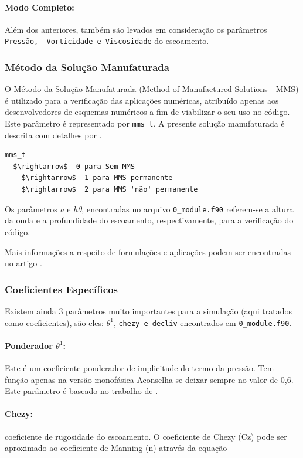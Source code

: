 \documentclass[12pt, a4paper]{article}
\begin{document}
\paragraph{Modo Completo:} Além dos anteriores, também são levados em consideração os parâmetros \verb|Pressão,  Vorticidade e Viscosidade| do escoamento.

\subsubsection{Método da Solução Manufaturada}
O Método da Solução Manufaturada (Method of Manufactured Solutions - MMS) é utilizado para a verificação das aplicações numéricas, atribuído apenas aos desenvolvedores de esquemas numéricos a fim de viabilizar o seu uso no código. Este parâmetro é representado por \verb|mms_t|. A presente solução manufaturada é descrita com detalhes por \cite{wang2009}.

\begin{lstlisting}[escapeinside='']
mms_t	
  $\rightarrow$  0 para Sem MMS
	$\rightarrow$  1 para MMS permanente
	$\rightarrow$  2 para MMS 'não' permanente
\end{lstlisting}

Os parâmetros \textit{a} e \textit{h0}, encontradas no arquivo \verb|0_module.f90| referem-se a altura da onda e a profundidade do escoamento, respectivamente, para a verificação do código.

Mais informações a respeito de formulações e aplicações podem ser encontradas no artigo \cite{monteiro2019}.

\subsubsection{Coeficientes Específicos}
Existem ainda 3 parâmetros muito importantes para a simulação (aqui tratados como coeficientes), são eles: $\theta^1$,  \verb|chezy e decliv| encontrados em \verb|0_module.f90|.

\paragraph{Ponderador $\theta^1$:} Este é um coeficiente ponderador de implicitude do termo da pressão. Tem função apenas na versão monofásica Aconselha-se deixar sempre no valor de 0,6. Este parâmetro é baseado no trabalho de \cite{patnaik1987}.
\paragraph{Chezy:} coeficiente de rugosidade do escoamento. O coeficiente de Chezy (Cz) pode ser aproximado ao coeficiente de Manning (n) através da equação
\end{document}
